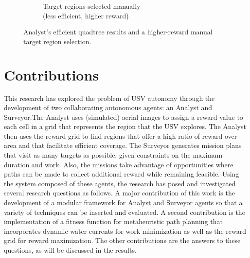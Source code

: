 \documentclass{tamuccthesis}
\begin{document}
\begin{figure}[H]
\begin{subfigure}[b]{0.475\textwidth}
        \caption{Target regions selected manually \\ (less efficient, higher reward)}   
        \label{fig:quadtree_b}
    \end{subfigure}
    \caption[Quadtree algorithm: efficient but sub-optimal.]{Analyst's efficient quadtree results and a higher-reward manual target region selection.}
    \label{fig:quadtree_compare}
\end{figure}

\section{Contributions}
\label{section:contributions}

This research has explored the problem of USV autonomy through the development of two collaborating autonomous agents: an Analyst and Surveyor.The Analyst uses (simulated) aerial images to assign a reward value to each cell in a grid that represents the region that the USV explores. The Analyst then uses the reward grid to find regions that offer a high ratio of reward over area and that facilitate efficient coverage. The Surveyor generates mission plans that visit as many targets as possible, given constraints on the maximum duration and work. Also, the missions take advantage of opportunities where paths can be made to collect additional reward while remaining feasible. Using the system composed of these agents, the research has posed and investigated several research questions as follows. A major contribution of this work is the development of a modular framework for Analyst and Surveyor agents so that a variety of techniques can be inserted and evaluated. A second contribution is the implementation of a fitness function for metaheuristic path planning that incorporates dynamic water currents for work minimization as well as the reward grid for reward maximization. The other contributions are the answers to these questions, as will be discussed in the results. 
\end{document}
